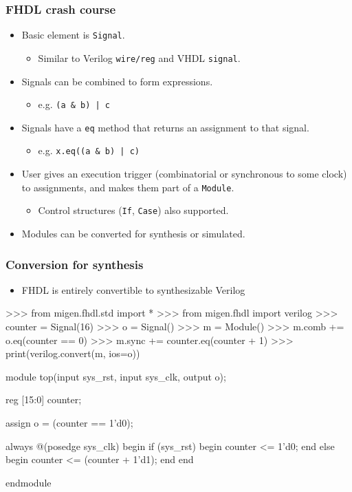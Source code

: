 \documentclass[serif,mathserif]{beamer}
\begin{document}
\begin{frame}[fragile]
\frametitle{FHDL crash course}
\begin{itemize}
\item Basic element is \verb!Signal!.
\begin{itemize}
\item Similar to Verilog \verb!wire/reg! and VHDL \verb!signal!.
\end{itemize}
\item Signals can be combined to form expressions.
\begin{itemize}
\item e.g. \verb!(a & b) | c!
\end{itemize}
\item Signals have a \verb!eq! method that returns an assignment to that signal.
\begin{itemize}
\item e.g. \verb!x.eq((a & b) | c)!
\end{itemize}
\item User gives an execution trigger (combinatorial or synchronous to some clock) to assignments, and makes them part of a \verb!Module!.
\begin{itemize}
\item Control structures (\verb!If!, \verb!Case!) also supported.
\end{itemize}
\item Modules can be converted for synthesis or simulated.
\end{itemize}
\end{frame}

\begin{frame}[fragile]
\frametitle{Conversion for synthesis}
\begin{itemize}
\item FHDL is entirely convertible to synthesizable Verilog
\end{itemize}
\begin{verbatimtab}
>>> from migen.fhdl.std import *
>>> from migen.fhdl import verilog
>>> counter = Signal(16)
>>> o = Signal()
>>> m = Module()
>>> m.comb += o.eq(counter == 0)
>>> m.sync += counter.eq(counter + 1)
>>> print(verilog.convert(m, ios={o}))
\end{verbatimtab}
\end{frame}

\begin{frame}[fragile]
\begin{verbatimtab}
module top(input sys_rst, input sys_clk, output o);

reg [15:0] counter;

assign o = (counter == 1'd0);

always @(posedge sys_clk) begin
        if (sys_rst) begin
                counter <= 1'd0;
        end else begin
                counter <= (counter + 1'd1);
        end
end

endmodule
\end{verbatimtab}
\end{frame}
\end{document}
